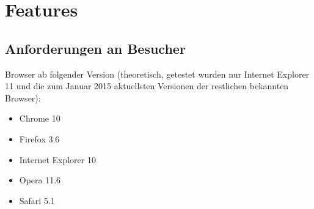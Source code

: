 \chapter{Features}

\section{Anforderungen an Besucher}
Browser ab folgender Version (theoretisch, getestet wurden nur Internet Explorer 11 und die zum Januar 2015 aktuellsten Versionen der restlichen bekannten Browser):
\begin{itemize}
	\item Chrome 10
	\item Firefox 3.6
	\item Internet Explorer 10
	\item Opera 11.6
	\item Safari 5.1
\end{itemize}